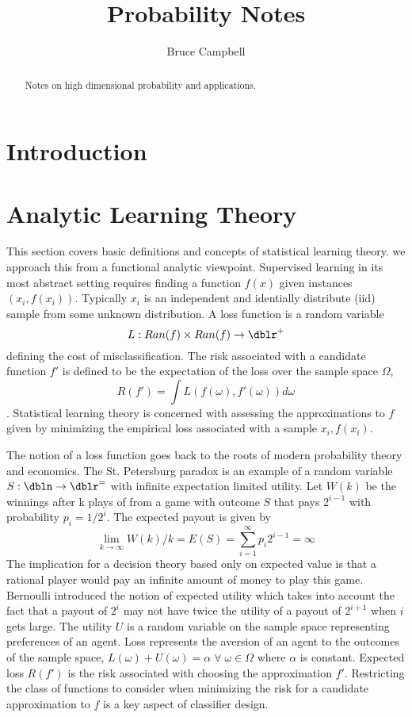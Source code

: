 \documentclass[a4paper]{article}
\title{ Probability Notes}
\author{Bruce Campbell}
\newcommand{\To}{\longrightarrow}
\theoremstyle{plain}
\theoremstyle{definition}
\theoremstyle{remark}
\newcommand{\fall}{\; \forall \;}
\numberwithin{equation}{section}
\begin{document}
\maketitle

\begin{abstract}
Notes on high dimensional probability and applications.
\end{abstract}

\section{Introduction}

\section{Analytic Learning Theory}
This section covers basic definitions and concepts of statistical learning theory.  we approach this from a functional analytic viewpoint.
Supervised learning in its most abstract setting requires finding a function $f(x)$ given instances ${ (x_i ,f(x_i))}$. Typically ${x_i}$ is an independent and identially distribute (iid) sample from some unknown distribution.  A loss function is a random variable
\[ L : Ran(f) \times Ran(f) \rightarrow \dblr^+\]
 defining the cost of misclassification.  The risk associated with a candidate function $f'$ is defined to be the expectation of the loss over the sample space $\Omega$,
\begin{equation*} R(f')=\int L( f(\omega), f'(\omega)) d\omega\end{equation*}.
Statistical learning theory is concerned with assessing the approximations to $f$ given by minimizing the empirical loss associated with a sample ${x_i ,f(x_i)}$.

The notion of a loss function goes back to the roots of modern probability theory and economics.  The St. Petersburg paradox is an example of a random variable $S : \dbln \rightarrow \dblr^=$ with infinite expectation limited utility. Let $W(k)$ be the winnings after k plays of from a game with outcome $S$ that pays $2^{i-1}$ with probability $p_i=1/2^i$. The expected payout is given by
\begin{equation*}
\lim_{k\To\infty} W(k)/k =E(S)=\sum\limits_{i=1}^{\infty} p_i 2^{i-1}= \infty
\end{equation*} The implication for a decision theory based only on expected value is that a rational player would pay an infinite amount of money to play this game. Bernoulli introduced the notion of expected utility which takes into account the fact that a payout of $2^i$ may not have twice the utility of a payout of $2^{i+1}$ when $i$ gets large.  The utility $U$ is a random variable on the sample space representing preferences of an agent.  Loss represents the aversion of an agent to the outcomes of the sample space, $L(\omega)+U(\omega) = \alpha \fall \omega \in \Omega$ where $\alpha$ is constant.  Expected loss $R(f')$ is the risk associated with choosing the approximation $f'$. Restricting the class of functions to consider when minimizing the risk for a candidate approximation to $f$ is a key aspect of classifier design.
\end{document}
